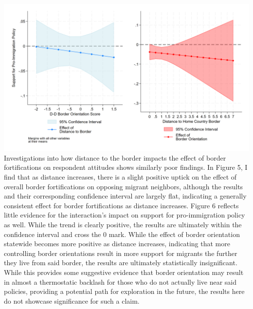 \documentclass[12pt,]{article}
\begin{document}
\includegraphics{figures/m4_policy_marginal_1.png} Investigations into
how distance to the border impacts the effect of border fortifications
on respondent attitudes shows similarly poor findings. In Figure 5, I
find that as distance increases, there is a slight positive uptick on
the effect of overall border fortifications on opposing migrant
neighbors, although the results and their corresponding confidence
interval are largely flat, indicating a generally consistent effect for
border fortifications as distance increases. Figure 6 reflects little
evidence for the interaction's impact on support for pro-immigration
policy as well. While the trend is clearly positive, the results are
ultimately within the confidence interval and cross the 0 mark. While
the effect of border orientation statewide becomes more positive as
distance increases, indicating that more controlling border orientations
result in more support for migrants the further they live from said
border, the results are ultimately statistically insignificant. While
this provides some suggestive evidence that border orientation may
result in almost a thermostatic backlash for those who do not actually
live near said policies, providing a potential path for exploration in
the future, the results here do not showcase significance for such a
claim.
\end{document}
